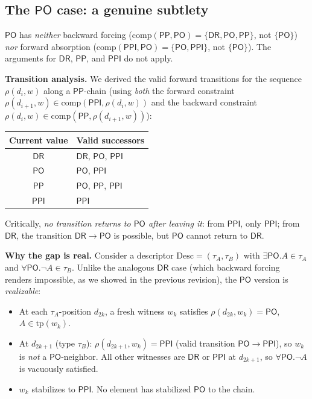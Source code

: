 \documentclass[11pt]{article}
\begin{document}
\subsection{The $\mathsf{PO}$ case: a genuine subtlety}
\label{sec:po}

$\mathsf{PO}$ has \emph{neither} backward forcing
($\mathrm{comp}(\mathsf{PP}, \mathsf{PO}) = \{\mathsf{DR},
\mathsf{PO}, \mathsf{PP}\}$, not $\{\mathsf{PO}\}$) \emph{nor}
forward absorption
($\mathrm{comp}(\mathsf{PPI}, \mathsf{PO}) = \{\mathsf{PO},
\mathsf{PPI}\}$, not $\{\mathsf{PO}\}$).  The arguments for
$\mathsf{DR}$, $\mathsf{PP}$, and $\mathsf{PPI}$ do not apply.

\medskip
\textbf{Transition analysis.}\; We derived the valid forward
transitions for the sequence $\rho(d_i, w)$ along a
$\mathsf{PP}$-chain (using \emph{both} the forward constraint
$\rho(d_{i+1}, w) \in \mathrm{comp}(\mathsf{PPI}, \rho(d_i, w))$
and the backward constraint
$\rho(d_i, w) \in \mathrm{comp}(\mathsf{PP}, \rho(d_{i+1}, w))$):

\begin{center}
\renewcommand{\arraystretch}{1.15}
\begin{tabular}{cl}
\toprule
\textbf{Current value} & \textbf{Valid successors} \\
\midrule
$\mathsf{DR}$ & $\mathsf{DR}$, $\mathsf{PO}$, $\mathsf{PPI}$ \\
$\mathsf{PO}$ & $\mathsf{PO}$, $\mathsf{PPI}$ \\
$\mathsf{PP}$ & $\mathsf{PO}$, $\mathsf{PP}$, $\mathsf{PPI}$ \\
$\mathsf{PPI}$ & $\mathsf{PPI}$ \\
\bottomrule
\end{tabular}
\end{center}

Critically, \emph{no transition returns to $\mathsf{PO}$ after
leaving it}: from $\mathsf{PPI}$, only $\mathsf{PPI}$; from
$\mathsf{DR}$, the transition $\mathsf{DR} \to \mathsf{PO}$ is
possible, but $\mathsf{PO}$ cannot return to $\mathsf{DR}$.

\medskip
\textbf{Why the gap is real.}\; Consider a descriptor
$\mathrm{Desc} = (\tau_A, \tau_B)$ with
$\exists\mathsf{PO}.A \in \tau_A$ and
$\forall\mathsf{PO}.\neg A \in \tau_B$.  Unlike the analogous
$\mathsf{DR}$ case (which backward forcing renders impossible,
as we showed in the previous revision), the $\mathsf{PO}$ version
is \emph{realizable}:

\begin{itemize}
\item At each $\tau_A$-position $d_{2k}$, a fresh witness $w_k$
  satisfies $\rho(d_{2k}, w_k) = \mathsf{PO}$, $A \in \mathrm{tp}(w_k)$.
\item At $d_{2k+1}$ (type $\tau_B$): $\rho(d_{2k+1}, w_k) = \mathsf{PPI}$
  (valid transition $\mathsf{PO} \to \mathsf{PPI}$), so $w_k$ is
  \emph{not} a $\mathsf{PO}$-neighbor.  All other witnesses are
  $\mathsf{DR}$ or $\mathsf{PPI}$ at $d_{2k+1}$, so
  $\forall\mathsf{PO}.\neg A$ is vacuously satisfied.
\item $w_k$ stabilizes to $\mathsf{PPI}$.  No element has
  stabilized $\mathsf{PO}$ to the chain.
\end{itemize}
\end{document}
